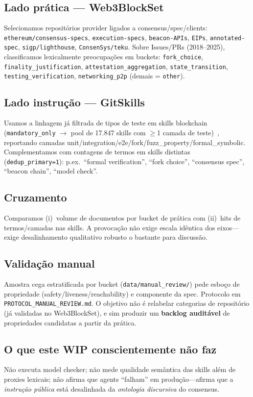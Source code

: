 \documentclass[10pt,conference]{IEEEtran}
\begin{document}
\subsection{Lado prática --- Web3BlockSet}
Selecionamos repositórios provider ligados a consensus/spec/clients: \texttt{ethereum/consensus-specs}, \texttt{execution-specs}, \texttt{beacon-APIs}, \texttt{EIPs}, \texttt{annotated-spec}, \texttt{sigp/lighthouse}, \texttt{ConsenSys/teku}. Sobre Issues/PRs (2018--2025), classificamos lexicalmente preocupações em buckets: \texttt{fork\_choice}, \texttt{finality\_justification}, \texttt{attestation\_aggregation}, \texttt{state\_transition}, \texttt{testing\_verification}, \texttt{networking\_p2p} (demais = \texttt{other}).

\subsection{Lado instrução --- GitSkills}
Usamos a linhagem já filtrada de tipos de teste em skills blockchain (\texttt{mandatory\_only} $\rightarrow$ pool de 17.847 skills com $\geq$1 camada de teste)~\cite{gitskills2026}, reportando camadas unit/integration/e2e/fork/fuzz\_property/formal\_symbolic. Complementamos com contagens de termos em skills distintas (\texttt{dedup\_primary=1}): p.ex.\ ``formal verification'', ``fork choice'', ``consensus spec'', ``beacon chain'', ``model check''.

\subsection{Cruzamento}
Comparamos (i)~volume de documentos por bucket de prática com (ii)~hits de termos/camadas nas skills. A provocação não exige escala idêntica dos eixos---exige desalinhamento qualitativo robusto o bastante para discussão.

\subsection{Validação manual}
Amostra cega estratificada por bucket (\texttt{data/manual\_review/}) pede esboço de propriedade (safety/liveness/reachability) e componente da spec. Protocolo em \texttt{PROTOCOL\_MANUAL\_REVIEW.md}. O objetivo não é relabelar categorias de repositório (já validadas no Web3BlockSet), e sim produzir um \textbf{backlog auditável} de propriedades candidatas a partir da prática.

\subsection{O que este WIP conscientemente não faz}
Não executa model checker; não mede qualidade semântica das skills além de proxies lexicais; não afirma que agents ``falham'' em produção---afirma que a \emph{instrução pública} está desalinhada da \emph{ontologia discursiva} do consensus.
\end{document}
